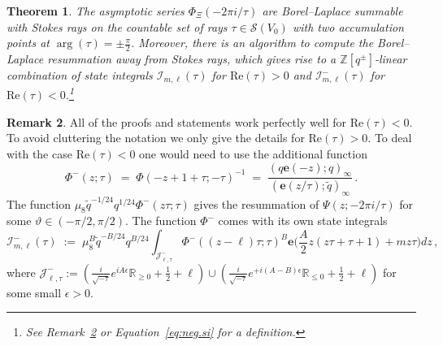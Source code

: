 \documentclass[12pt,reqno]{amsart}
\newtheorem{theorem}{Theorem}[section]
\theoremstyle{definition}
\newtheorem{remark}[theorem]{Remark}
\def\BZ{\mathbb Z}
\def\BR{\mathbb R}
\def\calI{\mathcal I}
\def\calJ{\mathcal J}
\def\Re{\mathrm{Re}}
\def\be{\begin{equation}}
\def\ee{\end{equation}}
\def\e{\mathbf e}
\renewcommand{\=}{\;=\;}
\newcommand{\tq}{\widetilde q}
\begin{document}
\begin{theorem}\label{thm:main_intro}
The asymptotic series $\Phi_{\Xi}(-2\pi i/\tau)$ are Borel--Laplace summable with Stokes rays on the countable set of rays $\tau\in\mathcal{S}(V_{0})$ with two accumulation points at $\arg(\tau)=\pm\frac{\pi}{2}$. Moreover, there is an algorithm to compute the Borel--Laplace resummation away from Stokes rays, which gives rise to a $\BZ[q^{\pm}]$-linear combination of state integrals $\calI_{m,\ell}(\tau)$ for $\Re(\tau)>0$ and $\calI_{m,\ell}^{-}(\tau)$ for $\Re(\tau)<0$.\footnote{See Remark~\ref{rem:neg.rt} or Equation~\eqref{eq:neg.si} for a definition.}
\end{theorem}
\begin{remark}\label{rem:neg.rt}
All of the proofs and statements work perfectly well for $\Re(\tau)<0$. To avoid cluttering the notation we only give the details for $\Re(\tau)>0$. To deal with the case $\Re(\tau)<0$ one would need to use the additional function
\be
  \Phi^{-}(z;\tau)
  \=
  \Phi(-z+1+\tau;-\tau)^{-1}
  \=
  \frac{(q\e(-z);q)_{\infty}}{(\e(z/\tau);\tq)_{\infty}}\,.
\ee
The function $\mu_8\tq^{-1/24}q^{1/24}\Phi^{-}(z\tau;\tau)$ gives the resummation of $\Psi(z;-2\pi i/\tau)$ for some $\vartheta\in (-\pi/2, \pi/2)$. The function $\Phi^-$ comes with its own state integrals
\be\label{eq:neg.si}
\calI_{m,\ell}^{-}(\tau)
\;:=\;
\mu_8^B\tq^{-B/24}q^{B/24}
\int_{\calJ_{\ell,\tau}^{-}}\Phi^{-}((z-\ell)\tau;\tau)^B \e\Big(\frac{A}{2} z(z\tau+\tau+1)+mz\tau\Big) dz\,,
\ee
where $\calJ_{\ell,\tau}^{-}:=(\tfrac{i}{\sqrt{-\tau}}e^{iA\epsilon}\BR_{\geq0}+\frac{1}{2}+\ell)\cup(\tfrac{i}{\sqrt{-\tau}}e^{+ i(A-B)\epsilon}\BR_{\leq0}+\frac{1}{2}+\ell)$ for some small $\epsilon>0$.
\end{remark}
\end{document}
